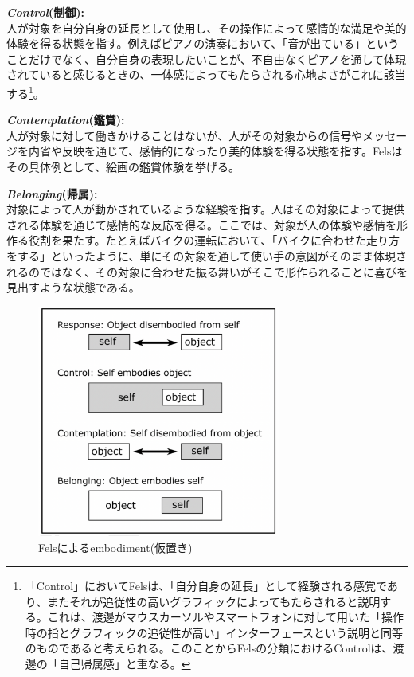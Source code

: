 \textbf{\textit{Control}(制御):}\\
人が対象を自分自身の延長として使用し、その操作によって感情的な満足や美的体験を得る状態を指す。例えばピアノの演奏において、「音が出ている」ということだけでなく、自分自身の表現したいことが、不自由なくピアノを通して体現されていると感じるときの、一体感によってもたらされる心地よさがこれに該当する\footnote{「Control」においてFelsは、「自分自身の延長」として経験される感覚であり、またそれが追従性の高いグラフィックによってもたらされると説明する。これは、渡邊がマウスカーソルやスマートフォンに対して用いた「操作時の指とグラフィックの追従性が高い」インターフェースという説明と同等のものであると考えられる。このことからFelsの分類におけるControlは、渡邊の「自己帰属感」と重なる。}。

\textbf{\textit{Contemplation}(鑑賞):}\\
人が対象に対して働きかけることはないが、人がその対象からの信号やメッセージを内省や反映を通じて、感情的になったり美的体験を得る状態を指す。Felsはその具体例として、絵画の鑑賞体験を挙げる。

\textbf{\textit{Belonging}(帰属):}\\
対象によって人が動かされているような経験を指す。人はその対象によって提供される体験を通じて感情的な反応を得る。ここでは、対象が人の体験や感情を形作る役割を果たす。たとえばバイクの運転において、「バイクに合わせた走り方をする」といったように、単にその対象を通して使い手の意図がそのまま体現されるのではなく、その対象に合わせた振る舞いがそこで形作られることに喜びを見出すような状態である。

\begin{figure}[H]
  \centering
  \includegraphics[width=8cm]{img/fels_diagram.png}
  \caption{Felsによるembodiment(仮置き)}
  \label{fig:fels_embodiment}
\end{figure}

